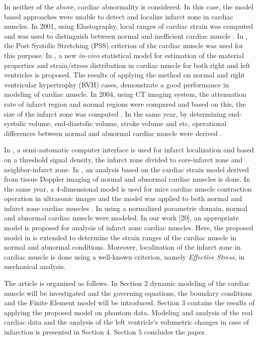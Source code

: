 \documentclass{jicspack}
\begin{document}
In neither of the above, cardiac abnormality is
considered. In this case, the model based approaches were unable to detect and localize
infarct zone in cardiac muscles. In 2001, using Elastography, local ranges of cardiac strain was computed and was used to
distinguish between normal and inefficient cardiac muscle \cite{11}. In \cite{12}, the Post
Systolic Stretching (PSS) criterion of the cardiac muscle was used for this purpose. In \cite{13}, a new \textit{in-vivo}
statistical model for estimation of the material properties and strain/stress distribution in cardiac muscle for both right and left ventricles is proposed. The results of applying the
method on normal and right ventricular hypertrophy (RVH) cases, demonstrate a good performance in modeling of cardiac muscle. In 2004, using CT imaging system, the attenuation rate of infarct region and normal regions were compared and based on this, the size of the infarct zone was computed \cite{14}. In the same year, by determining end-systolic volume, end-diastolic volume, stroke volume and etc, operational differences between normal and
abnormal cardiac muscle were derived \cite{15}.


In \cite{16}, a semi-automatic computer interface is used for infarct localization and based on a
threshold signal density, the infarct zone divided to core-infarct zone and neighbor-infarct
zone. In \cite{17}, an analysis based on the cardiac strain model derived from tissue Doppler imaging
of normal and abnormal cardiac muscles is done. In the same year, a 4-dimensional
model is used for mice cardiac muscle contraction operation in ultrasonic images and the
model was applied to both normal and infarct zone cardiac muscles \cite{18}. In \cite{19} using a
normalized parametric domain, normal and abnormal cardiac muscle were modeled. In our
work [20], an appropriate model is proposed for analysis of infarct zone cardiac muscles.
Here, the proposed model in \cite{20} is extended to determine the strain ranges of the cardiac
muscle in normal and abnormal conditions. Moreover, localization of the infarct zone in
cardiac muscle is done using a well-known criterion, namely \textit{Effective Stress}, in mechanical analysis.

The article is organized as follows. In Section 2  dynamic modeling of the cardiac muscle will be investigated and the governing equations, the boundary conditions and the Finite Element model will be introduced. Section 3 contains the results of applying the proposed model on phantom data. Modeling and analysis of the real cardiac data and the analysis of the left ventricle's volumetric changes in case of infarction is presented in Section 4. Section 5 concludes the paper.
\end{document}
